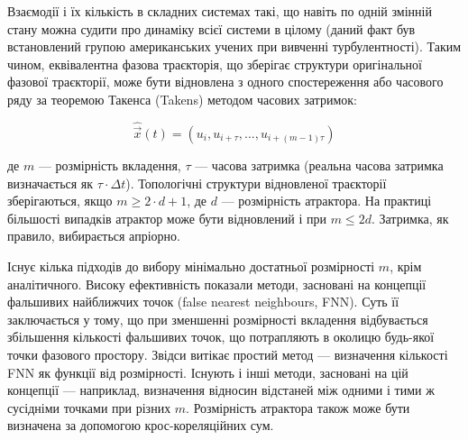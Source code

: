 \documentclass[
  letterpaper,
]{report}
\begin{document}
Взаємодії і їх кількість в складних системах такі, що навіть по одній
змінній стану можна судити про динаміку всієї системи в цілому (даний
факт був встановлений групою американських учених при вивченні
турбулентності). Таким чином, еквівалентна фазова траєкторія, що
зберігає структури оригінальної фазової траєкторії, може бути відновлена
з одного спостереження або часового ряду за теоремою Такенса (Takens)
методом часових затримок:

\[
\widehat{\vec x}(t)=(u_i,u_{i+\tau},...,u_{i+(m-1)\tau})
\]

де \(m\) --- розмірність вкладення, \(\tau\) --- часова затримка
(реальна часова затримка визначається як \(\tau \cdot \Delta t\)).
Топологічні структури відновленої траєкторії зберігаються, якщо
\(m \geq 2 \cdot d+1\), де \(d\) --- розмірність атрактора. На практиці
більшості випадків атрактор може бути відновлений і при \(m \leq 2d\).
Затримка, як правило, вибирається апріорно.

Існує кілька підходів до вибору мінімально достатньої розмірності \(m\),
крім аналітичного. Високу ефективність показали методи, засновані на
концепції фальшивих найближчих точок (false nearest neighbours, FNN).
Суть її заключається у тому, що при зменшенні розмірності вкладення
відбувається збільшення кількості фальшивих точок, що потрапляють в
околицю будь-якої точки фазового простору. Звідси витікає простий метод
--- визначення кількості FNN як функції від розмірності. Існують і інші
методи, засновані на цій концепції --- наприклад, визначення відносин
відстаней між одними і тими ж сусідніми точками при різних \(m\).
Розмірність атрактора також може бути визначена за допомогою
крос-кореляційних сум.
\end{document}
